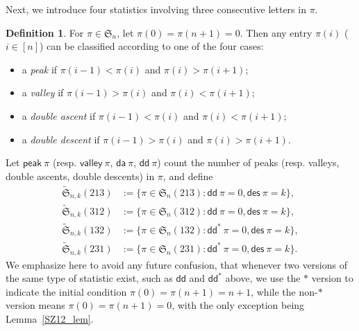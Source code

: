 \documentclass[12pt,reqno]{amsart}
\numberwithin{equation}{section}
\theoremstyle{plain}
\theoremstyle{definition}
\newtheorem{Def}[theorem]{Definition}
\def\S{\mathfrak{S}}
\def\da{\mathsf{da}}
\def\dd{\mathsf{dd}}
\def\des{\mathsf{des}}
\def\valley{\mathsf{valley}}
\def\peak{\mathsf{peak}}
\begin{document}
Next, we introduce four statistics involving three consecutive letters in $\pi$.
\begin{Def}
For $\pi\in\S_n$, let $\pi(0)=\pi(n+1)=0$. Then any entry $\pi(i)$ ($i\in[n]$) can be classified according to one of the four cases:
\begin{itemize}
\item a \emph{peak} if $\pi(i-1)<\pi(i)$ and $\pi(i)>\pi(i+1)$;
\item a \emph{valley} if $\pi(i-1)>\pi(i)$ and $\pi(i)<\pi(i+1)$;
\item a \emph{double ascent} if $\pi(i-1)<\pi(i)$ and $\pi(i)<\pi(i+1)$;
\item a \emph{double descent} if $\pi(i-1)>\pi(i)$ and $\pi(i)>\pi(i+1)$.
\end{itemize}
\end{Def}
Let $\peak\:\pi$ (resp. $\valley\:\pi$, $\da\:\pi$, $\dd\:\pi$) count the number of peaks (resp. valleys, double ascents, double descents) in $\pi$, and define
\begin{align*}
\widetilde{\S}_{n,k}(213)&:=\{\pi\in \S_{n}(213): \dd\:\pi=0, \des\:\pi=k \},\\
\widetilde{\S}_{n,k}(312)&:=\{\pi\in \S_{n}(312): \dd\:\pi=0, \des\:\pi=k \},\\
\widetilde{\S}_{n,k}(132)&:=\{\pi\in \S_{n}(132): \dd^*\:\pi=0, \des\:\pi=k\},\\
\widetilde{\S}_{n,k}(231)&:=\{\pi\in \S_{n}(231): \dd^*\:\pi=0, \des\:\pi=k\}.
\end{align*}
 We emphasize here to avoid any future confusion, that whenever two versions of the same type of statistic exist, such as $\dd$ and $\dd^*$ above, we use the $*$ version to indicate the initial condition $\pi(0)=\pi(n+1)=n+1$, while the non-$*$ version means $\pi(0)=\pi(n+1)=0$, with the only exception being Lemma~\ref{SZ12_lem}.
\end{document}

